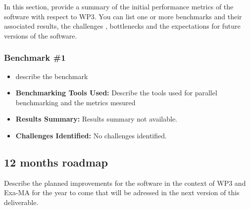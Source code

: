 In this section, provide a summary of the initial performance metrics of the software with respect to WP3.
You can list one or more benchmarks and their associated results, the challenges , bottlenecks and the expectations for future versions of the software.



\subsubsection{Benchmark \#1}
\begin{itemize}
    \item describe the benchmark
    \item \textbf{Benchmarking Tools Used:} Describe the tools used for parallel benchmarking and the metrics mesured
    \item \textbf{Results Summary:} Results summary not available.
    \item \textbf{Challenges Identified:} No challenges identified.
\end{itemize}

\subsection{12 months roadmap}
\label{sec:WP3:Arcane Framework:roadmap}

Describe the planned improvements  for the software in the context of WP3 and Exa-MA for the year to come that will be adressed in the next version of this deliverable.